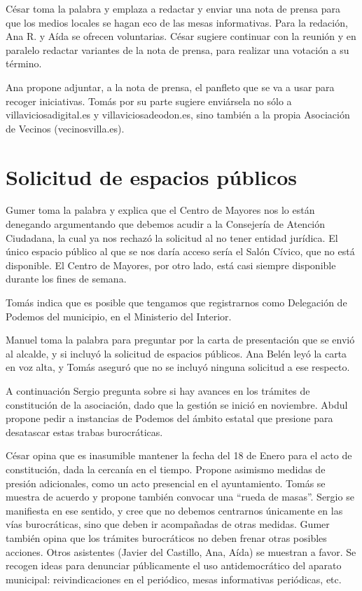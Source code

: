 \documentclass[11pt]{article}
\begin{document}
César toma la palabra y emplaza a redactar y enviar una nota de prensa para que los medios locales se hagan eco de las mesas informativas. Para la redación, Ana R. y Aída se ofrecen voluntarias. César sugiere continuar con la reunión y en paralelo redactar variantes de la nota de prensa, para realizar una votación a su término.

Ana propone adjuntar, a la nota de prensa, el panfleto que se va a u\-sar para recoger iniciativas. Tomás por su parte sugiere enviársela no sólo a villaviciosadigital.es y villaviciosadeodon.es, sino también a la propia Asociación de Vecinos (vecinosvilla.es).

\section{Solicitud de espacios públicos}
\label{sec-5}

Gumer toma la palabra y explica que el Centro de Mayores nos lo están denegando argumentando que debemos acudir a la Consejería de Atención Ciudadana, la cual ya nos rechazó la solicitud al no tener entidad jurídica. El único espacio público al que se nos daría acceso sería el Salón Cívico, que no está disponible. El Centro de Mayores, por otro lado, está casi siempre disponible durante los fines de semana.

Tomás indica que es posible que tengamos que registrarnos como Delegación de Podemos del municipio, en el Ministerio del Interior.

Manuel toma la palabra para preguntar por la carta de presentación que se envió al alcalde, y si incluyó la solicitud de espacios públicos. Ana Belén leyó la carta en voz alta, y Tomás aseguró que no se incluyó ninguna solicitud a ese respecto.

A continuación Sergio pregunta sobre si hay avances en los trámites de constitución de la asociación, dado que la gestión se inició en noviembre. Abdul propone pedir a instancias de Podemos del ámbito estatal que presione para desatascar estas trabas burocráticas.

César opina que es inasumible mantener la fecha del 18 de Enero para el acto de constitución, dada la cercanía en el tiempo. Propone asimismo medidas de presión adicionales, como un acto presencial en el ayuntamiento.
Tomás se muestra de acuerdo y propone también convocar una ``rueda de masas''. Sergio se manifiesta en ese sentido, y cree que no debemos centrarnos únicamente en las vías burocráticas, sino que deben ir acompañadas de otras medidas.
Gumer también opina que los trámites burocráticos no deben frenar otras posibles acciones. Otros asistentes (Javier del Castillo, Ana, Aída) se muestran a favor. Se recogen ideas para denunciar públicamente el uso antidemocrático del aparato municipal: reivindicaciones en el periódico, mesas informativas periódicas, etc.
\end{document}
